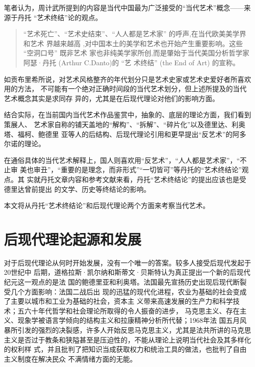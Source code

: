 笔者认为，周计武所提到的内容是当代中国最为广泛接受的“当代艺术”概念——来源于丹托
“艺术终结”论的观点。
\begin{quotation}
  “艺术死亡”、“艺术史结束”、“人人都是艺术家” 的呼声,在当代欧美美学界和艺术
界越来越高 ,对中国本土的美学和艺术也开始产生重要影响。这些 “空洞口号” 既非艺术
家也非纯美学家所创,而是肇始于当代美国分析哲学家阿瑟·丹托 (Arthur C.Danto)的 “艺
术终结” (the End of Art) 的宣称。\cite{boduoyishu}
\end{quotation}

如贡布里希所说，对艺术风格整齐的年代划分只是艺术史家或艺术史爱好者所喜欢用的方法，
不可能有一个绝对正确时间段的当代艺术划分，但上述所提及的当代艺术概念其实是求同存
异的，尤其是在后现代理论对他们的影响方面。

结合实际，在当前国内当代艺术作品鉴赏中，抽象的、底层的理论方面，我们看到策展人、
艺术家自称的铺天盖地的“解构”、“拆解”、“碎片化”以及德里达、利奥塔、福柯、鲍德里
亚等人的后结构、后现代理论引用和更早提出“反艺术”的阿多尔诺的理论。

在通俗具体的当代艺术解释上，国人则喜欢用“反艺术”，“人人都是艺术家”，“不止审
美也审丑”，“重要的是理念，而非形式”“一切皆可”等丹托的“艺术终结论”观点。其
实就丹托文章内容和参考文献来看，丹托“艺术终结论”的提出应该也是受德里达曾前提出
的文学、历史等终结论的影响。

本文将从丹托“艺术终结论”和后现代理论两个方面来考察当代艺术。

\section{后现代理论起源和发展}

对于后现代理论从何时开始发展，没有一个唯一的答案。较多人接受后现代发起于20世纪中
后期，道格拉斯·凯尔纳和斯蒂文·贝斯特认为真正提出一个新的后现代纪元这一观点的是法
国的鲍德里亚和利奥塔。法国最先宣扬历史出现后现代断裂受几个方面影响：法国二战后出
现的迅猛的现代化进程，农业为基础的社会变成了主要以城市和工业为基础的社会，资本主
义带来高速发展的生产力和科学技术；五六十年代哲学和社会理论所取得的令人振奋的进步，
马克思主义、存在主义、现象学被语言学倾向的结构主义和拉康精神分析所代替；1968年法
国五月风暴所引发的强烈的决裂感，许多人开始反思马克思主义，尤其是法共所讲的马克思
主义是否过于教条和狭隘甚至是压迫性的，不能从理论上说明当代社会及其多样化的权利样
式，并且批判了把知识当成获取权力和统治工具的做法，也批判了自由主义制度在解决民众
不满情绪方面的无能。

